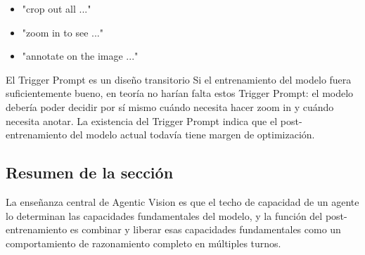 \begin{itemize}
    \item "crop out all ..."
    \item "zoom in to see ..."
    \item "annotate on the image ..."
\end{itemize}

\begin{knowledgebox}{El Trigger Prompt es un diseño transitorio}
Si el entrenamiento del modelo fuera suficientemente bueno, en teoría no harían falta estos Trigger Prompt: el modelo debería poder decidir por sí mismo cuándo necesita hacer zoom in y cuándo necesita anotar. La existencia del Trigger Prompt indica que el post-entrenamiento del modelo actual todavía tiene margen de optimización.
\end{knowledgebox}

\subsection{Resumen de la sección}

La enseñanza central de Agentic Vision es que el techo de capacidad de un agente lo determinan las capacidades fundamentales del modelo, y la función del post-entrenamiento es combinar y liberar esas capacidades fundamentales como un comportamiento de razonamiento completo en múltiples turnos.


